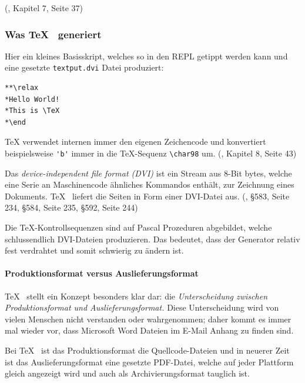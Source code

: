 (\cite{tex-a}, Kapitel 7, Seite 37)

\subsubsection{Was \TeX~ generiert}

Hier ein kleines Basisskript, welches so in den REPL getippt werden kann und
eine gesetzte \lstinline|textput.dvi| Datei produziert:

\begin{verbatim}
**\relax
*Hello World!
*This is \TeX
*\end
\end{verbatim}

TeX verwendet internen immer den eigenen Zeichencode und konvertiert beispielsweise
\lstinline|'b'| immer in die \TeX-Sequenz \lstinline|\char98| um.
(\cite{tex-a}, Kapitel 8, Seite 43)

Das \emph{device-independent file format (DVI)} ist ein Stream aus
8-Bit bytes, welche eine Serie an
Maschinencode ähnliches Kommandos enthält, zur Zeichnung eines Dokuments.
\TeX~ liefert die Seiten in Form einer DVI-Datei aus.
(\cite{tex-b}, §583, Seite 234, §584, Seite 235, §592, Seite 244)

Die \TeX-Kontrollsequenzen sind auf Pascal Prozeduren abgebildet,
welche schlussendlich DVI-Dateien produzieren. Das bedeutet, dass der Generator
relativ fest verdrahtet und somit schwierig zu ändern ist.

\paragraph{Produktionsformat versus Auslieferungsformat}

\TeX~ stellt ein Konzept besonders klar dar: die \emph{Unterscheidung
zwischen Produktionsformat und Auslieferungsformat.} Diese Unterscheidung
wird von vielen Menschen nicht verstanden oder wahrgenommen; daher kommt
es immer mal wieder vor, dass Microsoft Word Dateien im E-Mail Anhang zu
finden sind.

Bei \TeX~ ist das Produktionsformat die Quellcode-Dateien und in neuerer
Zeit ist das Auslieferungsformat eine gesetzte PDF-Datei, welche auf jeder
Plattform gleich angezeigt wird und auch als Archivierungsformat tauglich
ist.

